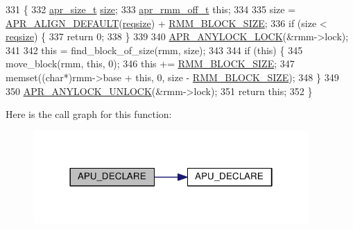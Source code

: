\begin{DoxyCode}
331 \{
332     \hyperlink{group__apr__platform_gaaa72b2253f6f3032cefea5712a27540e}{apr\_size\_t} \hyperlink{group__APACHE__CORE__CONFIG_ga2bd3edb50f631a96f1b729fde236ff43}{size};
333     \hyperlink{group__APR__Util__RMM_ga70b508c81a0bc75350efdefb3410af12}{apr\_rmm\_off\_t} \textcolor{keyword}{this};
334         
335     size = \hyperlink{group__apr__general_gab484e98426221f3212fcb67af0467381}{APR\_ALIGN\_DEFAULT}(\hyperlink{group__apr__shm_gab0526251505fe7f4db6377b7617e16d9}{reqsize}) + \hyperlink{apr__rmm_8c_a702b3d268d954b9446c019ca86f463fa}{RMM\_BLOCK\_SIZE};
336     \textcolor{keywordflow}{if} (size < \hyperlink{group__apr__shm_gab0526251505fe7f4db6377b7617e16d9}{reqsize}) \{
337         \textcolor{keywordflow}{return} 0;
338     \}
339 
340     \hyperlink{apr__anylock_8h_ac43b130fb19a434647c34e1d7040fc49}{APR\_ANYLOCK\_LOCK}(&rmm->lock);
341 
342     \textcolor{keyword}{this} = find\_block\_of\_size(rmm, size);
343 
344     \textcolor{keywordflow}{if} (\textcolor{keyword}{this}) \{
345         move\_block(rmm, \textcolor{keyword}{this}, 0);
346         \textcolor{keyword}{this} += \hyperlink{apr__rmm_8c_a702b3d268d954b9446c019ca86f463fa}{RMM\_BLOCK\_SIZE};
347         memset((\textcolor{keywordtype}{char}*)rmm->base + \textcolor{keyword}{this}, 0, size - \hyperlink{apr__rmm_8c_a702b3d268d954b9446c019ca86f463fa}{RMM\_BLOCK\_SIZE});
348     \}
349 
350     \hyperlink{apr__anylock_8h_a367f0d4cc5239e95ee925542d4a0b3fb}{APR\_ANYLOCK\_UNLOCK}(&rmm->lock);
351     \textcolor{keywordflow}{return} \textcolor{keyword}{this};
352 \}
\end{DoxyCode}


Here is the call graph for this function\+:
\nopagebreak
\begin{figure}[H]
\begin{center}
\leavevmode
\includegraphics[width=298pt]{group__APR__Util__RMM_ga816fbaf1e2e831c43acc9990e3f8cd96_cgraph}
\end{center}
\end{figure}


